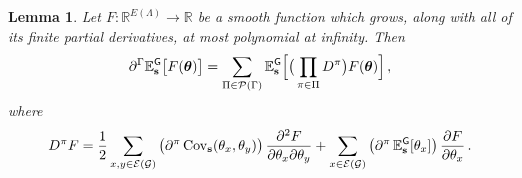 \documentclass[11pt]{article}
\newtheorem{lemma}[theorem]{Lemma}
\theoremstyle{definition}
\theoremstyle{remark}
\numberwithin{theorem}{section}
\def\La{{\Lambda}}
\def\Ga{{\Gamma}}
\newcommand{\bR}{\mathbb R}
\newcommand{\bE}{\mathbb E}
\newcommand{\cE}{\mathcal{E}}
\newcommand{\cG}{\mathcal G}
\newcommand{\Cov}{\operatorname{Cov}}
\begin{document}
    \begin{lemma} \label{lemma:gaussian_integration_by_parts}
        Let $F:\bR^{E(\La)} \to \bR$ be a smooth function which grows, along with all of its finite partial derivatives, at most polynomial at infinity. Then
        \[
        \partial^\Ga \bE_{\mathbf{s}}^{\sf G}\big[ F(\boldsymbol{\theta}) \big] = \sum_{\Pi\in \mathcal{P}(\Ga)} \bE_{\mathbf{s}}^{\sf G}\Big[ \big(\prod_{\pi\in \Pi} D^\pi\big) F(\boldsymbol{\theta}) \Big] \, ,
        \]
        where
        \begin{equation} \label{eq:def_of_D_pi}
         D^\pi F = \frac{1}{2} \sum_{x,y\in \cE(\cG)} \big(\partial^\pi \Cov_{\mathbf{s}} (\theta_x,\theta_y) \big) \, \frac{\partial^2 F}{ \partial \theta_x \partial \theta_y} + \sum_{x\in \cE(\cG)} \big(\partial^\pi \, \bE_{\mathbf{s}}^{\sf G}[\theta_x]\big) \, \frac{\partial F}{\partial \theta_x} \, .
        \end{equation}
    \end{lemma}
\end{document}
